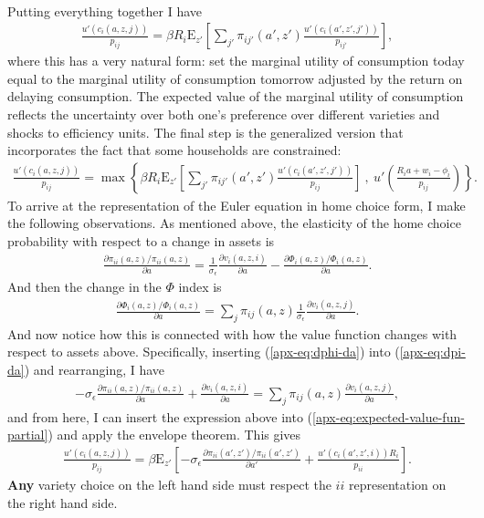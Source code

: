 \documentclass[12pt,pdftex]{article}
\begin{document}
\begin{onehalfspacing}
\begin{align}
\end{align}
Putting everything together I have
\begin{align}
\frac{u'(c_{i}(a, z, j))}{p_{ij}} = \beta R_{i} \mathrm{E}_{z'} \left[ \sum_{j'} \pi_{ij'}(a', z') \frac{u'(c_{i}(a', z',j'))}{p_{ij'}} \right],
\label{apx-eq:euler}
\end{align}
where this has a very natural form: set the marginal utility of consumption today equal to the marginal utility of consumption tomorrow adjusted by the return on delaying consumption. The expected value of the marginal utility of consumption reflects the uncertainty over both one's preference over different varieties and shocks to efficiency units. The final step is the generalized version that incorporates the fact that some households are constrained:
\begin{align}
\frac{u'(c_{i}(a, z, j))}{p_{ij}} = \max \left\{ \beta R_{i} \mathrm{E}_{z'} \left[ \sum_{j'} \pi_{ij'}(a', z') \frac{u'(c_{i}(a', z', j'))}{p_{ij}} \right] \ , \  u' \left( \frac{R_i a + w_i - \phi_{i}}{p_{ij}} \right) \right \}.
\label{eq:apx-euler-equation}
\end{align}
To arrive at the representation of the Euler equation in home choice form, I make the following observations. As mentioned above, the elasticity of the home choice probability with respect to a change in assets is
\begin{align}
\frac{\partial \pi_{ii}(a,z) / \pi_{ii}(a,z) }{\partial a} = \frac{1}{\sigma_{\epsilon}}\frac{\partial v_{i}(a,z,i)}{\partial a} - \frac{\partial \Phi_{i}(a,z) / \Phi_{i}(a,z)}{\partial a}.
\label{apx-eq:dpi-da}
\end{align}
And then the change in the $\Phi$ index is
\begin{align}
\frac{\partial \Phi_{i}(a,z) / \Phi_{i}(a,z)}{\partial a} = \sum_{j} \pi_{ij}(a,z) \frac{1}{\sigma_{\epsilon}}\frac{\partial v_{i}(a,z,j)}{\partial a}.
\label{apx-eq:dphi-da}
\end{align}
And now notice how this is connected with how the value function changes with respect to assets above. Specifically, inserting (\ref{apx-eq:dphi-da}) into (\ref{apx-eq:dpi-da}) and rearranging, I have
\begin{align}
-\sigma_{\epsilon} \frac{\partial \pi_{ii}(a,z) / \pi_{ii}(a,z) }{\partial a} + \frac{\partial v_{i}(a,z,i)}{\partial a} =
\sum_{j} \pi_{ij}(a,z) \frac{\partial v_{i}(a,z,j)}{\partial a},
\end{align}
and from here, I can insert the expression above into (\ref{apx-eq:expected-value-fun-partial}) and apply the envelope theorem. This gives
\begin{align}
\frac{u'(c_{i}(a, z, j))}{p_{ij}} = \beta \mathrm{E}_{z'} \left[ -\sigma_{\epsilon} \frac{\partial \pi_{ii}(a',z') / \pi_{ii}(a',z')}{\partial a'} + \frac{u'(c_{i}(a', z', i))R_i}{p_{ii}} \right].
\label{apx-eq:homechoice-euler}
\end{align}
\textbf{Any} variety choice on the left hand side must respect the $ii$ representation on the right hand side.


\end{onehalfspacing}
\end{document}
